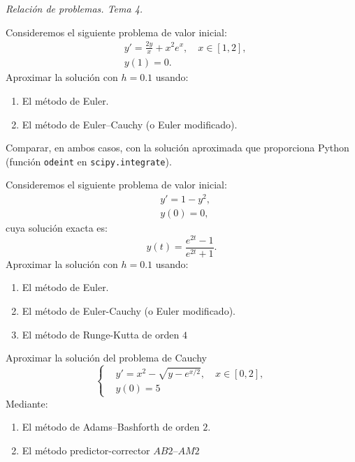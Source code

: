 \documentclass[11pt]{article}
\begin{document}
\begin{flushright}
  \LARGE\it Relación de problemas. Tema \huge 4.\\
  \bigskip
\end{flushright}

\begin{problemas}

  \begin{problema}
    Consideremos el siguiente problema de valor inicial:
    \begin{align*}
      &y'=\frac{2y}{x} + x^2e^x, \quad x\in[1,2],\\
      &y(1)=0.
    \end{align*}
    Aproximar la solución con $h=0.1$ usando:
    \begin{enumerate}
    \item El método de Euler.
    \item El método de Euler--Cauchy (o Euler modificado).
    \end{enumerate}
    Comparar, en ambos casos, con la solución aproximada que
    proporciona Python (función \texttt{odeint} en
    \texttt{scipy.integrate}).
  \end{problema}
  
  \begin{problema}%
    Consideremos el siguiente problema de valor inicial:
    \begin{align*}
      &y'=1-y^2,\\
      &y(0)=0,
    \end{align*}
    cuya solución exacta es:
    $$ y(t) = \frac{e^{2t}-1}{e^{2t}+1}.$$
    Aproximar la solución con $h=0.1$ usando:
    \begin{enumerate}
    \item El método de Euler.
    \item El método de Euler-Cauchy (o Euler
      modificado).
    \item El método de Runge-Kutta de orden $4$
    \end{enumerate}
  \end{problema}

  \begin{problema}
    Aproximar la solución del problema de Cauchy
    \begin{equation*}
      \left\{
      \begin{aligned}
        &y'=x^2 - \sqrt{y-e^{x/2}}, \quad x\in[0,2], \\
        &y(0)=5
      \end{aligned}
      \right.
    \end{equation*}
    Mediante:
    \begin{enumerate}
    \item El método de Adams--Bashforth de orden $2$.
    \item El método predictor-corrector $AB2$--$AM2$
    \end{enumerate}
  \end{problema}
  
  \end{problemas}
\end{document}
